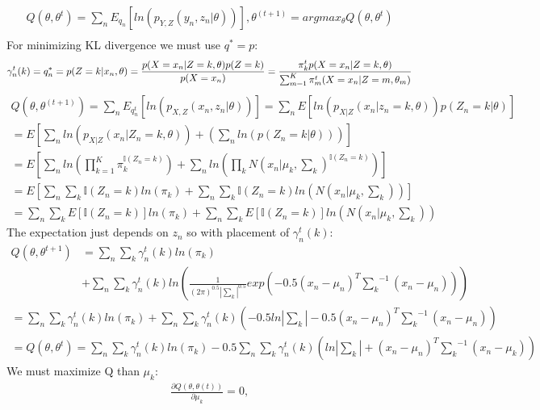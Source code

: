 \documentclass[12pt]{article}
\begin{document}
\begin{qsolve}[solution]
    \begin{gather*}
        Q(\theta,\theta^t)=\sum_{n}E_{q_n}[ln(p_{Y,Z}(y_n,z_n|\theta))],\theta^{(t+1)}=argmax_\theta Q(\theta,\theta^t) \\
    \end{gather*}
    For minimizing KL divergence we must use $q^*=p$:
    \begin{equation*}
        \gamma_n^t(k)=q_n^*=p(Z=k|x_n,\theta)=\frac{p(X=x_n|Z=k,\theta)p(Z=k)}{p(X=x_n)}\\
        =\frac{\pi_k^tp(X=x_n|Z=k,\theta)}{\sum_{m=1}^K\pi_m^t(X=x_n|Z=m,\theta_m)}
    \end{equation*}
    \splitqsolve
    \begin{gather*}
        Q(\theta,\theta^{(t+1)})=\sum_nE_{q_n^t}[ln(p_{X,Z}(x_n,z_n|\theta))]=\sum_n E[ln(p_{X|Z}(x_n|z_n=k,\theta))p(Z_n=k|\theta)] \\
        = E[\sum_nln(p_{X|Z}(x_n|Z_n=k,\theta))+(\sum_nln(p(Z_n=k|\theta)))]  \\
        = E[\sum_nln(\prod_{k=1}^K\pi_k^{\mathbb{I}(Z_n=k)})+\sum_nln(\prod_kN(x_n|\mu_k,\sum_k)^{\mathbb{I}(Z_n=k)})] \\
        = E[\sum_n\sum_k{\mathbb{I}(Z_n=k)}ln(\pi_k)+\sum_n\sum_k{\mathbb{I}(Z_n=k)}ln(N(x_n|\mu_k,\sum_k))] \\
        = \sum_n\sum_kE[{\mathbb{I}(Z_n=k)}]ln(\pi_k)+\sum_n\sum_kE[{\mathbb{I}(Z_n=k)}]ln(N(x_n|\mu_k,\sum_k))
    \end{gather*}
    The expectation just depends on $z_n$ so with placement of $\gamma_n^t(k)$:
    \begin{align*}
        Q(\theta,\theta^{t+1}) & =\sum_n\sum_k\gamma_n^t(k)ln(\pi_k)                                                                               \\
                               & + \sum_n\sum_k\gamma_n^t(k)ln(\frac{1}{(2\pi)^{0.5}|\sum_k|^{0.5}}exp(-0.5(x_n-\mu_n)^T{\sum_k}^{-1}(x_n-\mu_n)))
    \end{align*}
    \begin{gather*}
        =\sum_n\sum_k\gamma_n^t(k)ln(\pi_k)+\sum_n\sum_k\gamma_n^t(k)(-0.5ln|\sum_k|-0.5(x_n-\mu_n)^T{\sum_k}^{-1}(x_n-\mu_n)) \\
        = Q(\theta,\theta^t)=\sum_n\sum_k\gamma_n^t(k)ln(\pi_k)-0.5\sum_n\sum_k\gamma_n^t(k)(ln|\sum_k|+(x_n-\mu_n)^T{\sum_k}^{-1}(x_n-\mu_k))
    \end{gather*}
    We must maximize Q than $\mu_k$:
    \begin{gather*}
        \frac{\partial Q(\theta,\theta(t))}{\partial \mu_k}=0,\\

\end{gather*}
\end{qsolve}
\end{document}
